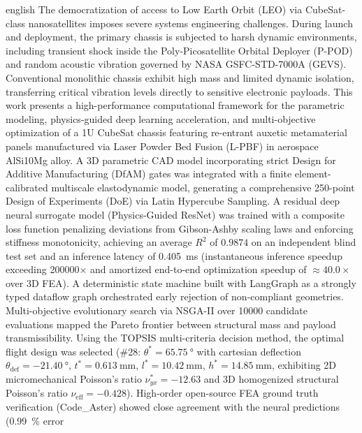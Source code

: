 
\begin{center}
\ABNTEXchapterfont\bfseries\Large\imprimirtitleenglish
\end{center}

\begin{resumo}[Abstract]
\begin{otherlanguage*}{english}
The democratization of access to Low Earth Orbit (LEO) via CubeSat-class nanosatellites imposes severe systems engineering challenges. During launch and deployment, the primary chassis is subjected to harsh dynamic environments, including transient shock inside the Poly-Picosatellite Orbital Deployer (P-POD) and random acoustic vibration governed by NASA GSFC-STD-7000A (GEVS). Conventional monolithic chassis exhibit high mass and limited dynamic isolation, transferring critical vibration levels directly to sensitive electronic payloads. This work presents a high-performance computational framework for the parametric modeling, physics-guided deep learning acceleration, and multi-objective optimization of a 1U CubeSat chassis featuring re-entrant auxetic metamaterial panels manufactured via Laser Powder Bed Fusion (L-PBF) in aerospace AlSi10Mg alloy. A 3D parametric CAD model incorporating strict Design for Additive Manufacturing (DfAM) gates was integrated with a finite element-calibrated multiscale elastodynamic model, generating a comprehensive 250-point Design of Experiments (DoE) via Latin Hypercube Sampling. A residual deep neural surrogate model (Physics-Guided ResNet) was trained with a composite loss function penalizing deviations from Gibson-Ashby scaling laws and enforcing stiffness monotonicity, achieving an average $R^2$ of $0.9874$ on an independent blind test set and an inference latency of \SI[output-decimal-marker={.}]{0.405}{\milli\second} (instantaneous inference speedup exceeding \num[group-separator={,}]{200000}$\times$ and amortized end-to-end optimization speedup of $\approx 40.0\times$ over 3D FEA). A deterministic state machine built with LangGraph as a strongly typed dataflow graph orchestrated early rejection of non-compliant geometries. Multi-objective evolutionary search via NSGA-II over \num[group-separator={,}]{10000} candidate evaluations mapped the Pareto frontier between structural mass and payload transmissibility. Using the TOPSIS multi-criteria decision method, the optimal flight design was selected (\#28: $\theta^* = \SI[output-decimal-marker={.}]{65.75}{\degree}$ with cartesian deflection $\theta_{\text{def}} = \SI[output-decimal-marker={.}]{-21.40}{\degree}$, $t^* = \SI[output-decimal-marker={.}]{0.613}{\milli\metre}$, $l^* = \SI[output-decimal-marker={.}]{10.42}{\milli\metre}$, $h^* = \SI[output-decimal-marker={.}]{14.85}{\milli\metre}$, exhibiting 2D micromechanical Poisson's ratio $\nu_{yx}^* = -12.63$ and 3D homogenized structural Poisson's ratio $\nu_{\text{eff}} = -0.428$). High-order open-source FEA ground truth verification (Code\_Aster) showed close agreement with the neural predictions (\SI[output-decimal-marker={.}]{0.99}{\percent} error 
\end{otherlanguage*}
\end{resumo}
